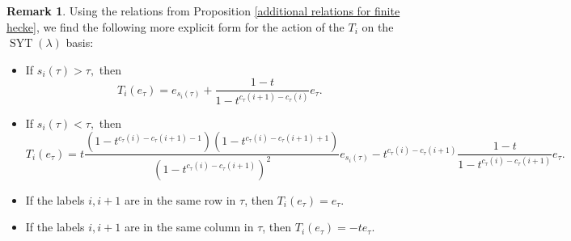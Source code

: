 \documentclass[12pt,reqno]{amsart}
\theoremstyle{definition}
\newtheorem{remark}{Remark}
\DeclareMathOperator{\SYT}{\mathrm{SYT}}
\begin{document}
\begin{remark}\label{remark explicit action}
    Using the relations from Proposition \ref{additional relations for finite hecke}, we find the following more explicit form for the action of the $T_i$ on the $\SYT(\lambda)$ basis:
\begin{itemize}
    \item If $s_i(\tau)> \tau,$ then 
    $$T_i(e_{\tau}) = e_{s_{i}(\tau)} + \frac{1-t}{1-t^{c_{\tau}(i+1)-c_{\tau}(i)}} e_{\tau}.$$
    \item If $s_i(\tau) < \tau,$ then 
    $$T_i(e_{\tau}) = t\frac{(1-t^{c_{\tau}(i) - c_{\tau}(i+1) -1})(1-t^{c_{\tau}(i)-c_{\tau}(i+1)+1})}{(1-t^{c_{\tau}(i)-c_{\tau}(i+1)})^2} e_{s_{i}(\tau)} - t^{c_{\tau}(i)-c_{\tau}(i+1)} \frac{1-t}{1-t^{c_{\tau}(i)-c_{\tau}(i+1)}}e_{\tau}.$$
    \item If the labels $i,i+1$ are in the same row in $\tau$, then $T_i(e_{\tau}) = e_{\tau}.$
        \item If the labels $i,i+1$ are in the same column in $\tau$, then $T_i(e_{\tau}) = -te_{\tau}.$
\end{itemize}
\end{remark}
\end{document}
